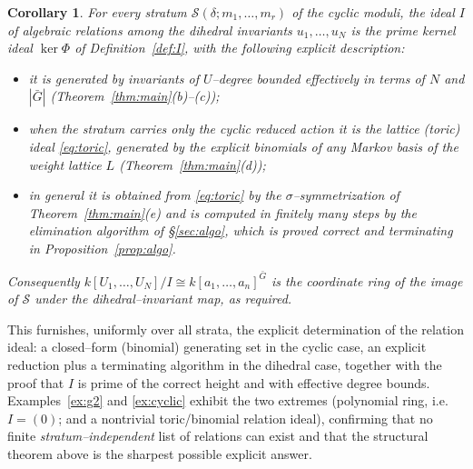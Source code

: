 \documentclass{amsart}
\newtheorem{corollary}[theorem]{Corollary}
\theoremstyle{definition}
\begin{document}
\begin{corollary}\label{cor:answer}
For every stratum $\mathcal S(\delta;m_1,\dots,m_r)$ of the cyclic moduli, the ideal
$I$ of algebraic relations among the dihedral invariants $u_1,\dots,u_N$ is the prime
kernel ideal $\ker\Phi$ of Definition~\ref{def:I}, with the following explicit
description:
\begin{itemize}
\item it is generated by invariants of $U$--degree bounded effectively in terms of
$N$ and $|\bar G|$ (Theorem~\ref{thm:main}(b)--(c));
\item when the stratum carries only the cyclic reduced action it is the lattice
(toric) ideal \eqref{eq:toric}, generated by the explicit binomials of any Markov
basis of the weight lattice $L$ (Theorem~\ref{thm:main}(d));
\item in general it is obtained from \eqref{eq:toric} by the $\sigma$--symmetrization
of Theorem~\ref{thm:main}(e) and is computed in finitely many steps by the
elimination algorithm of \S\ref{sec:algo}, which is proved correct and terminating
in Proposition~\ref{prop:algo}.
\end{itemize}
Consequently $k[U_1,\dots,U_N]/I\cong k[a_1,\dots,a_n]^{\bar G}$ is the coordinate
ring of the image of $\mathcal S$ under the dihedral--invariant map, as required.
\end{corollary}

This furnishes, uniformly over all strata, the explicit determination of the
relation ideal: a closed--form (binomial) generating set in the cyclic case, an
explicit reduction plus a terminating algorithm in the dihedral case, together with
the proof that $I$ is prime of the correct height and with effective degree bounds.
Examples~\ref{ex:g2} and \ref{ex:cyclic} exhibit the two extremes (polynomial ring,
i.e.\ $I=(0)$; and a nontrivial toric/binomial relation ideal), confirming that no finite
\emph{stratum--independent} list of relations can exist and that the structural
theorem above is the sharpest possible explicit answer.
\end{document}
